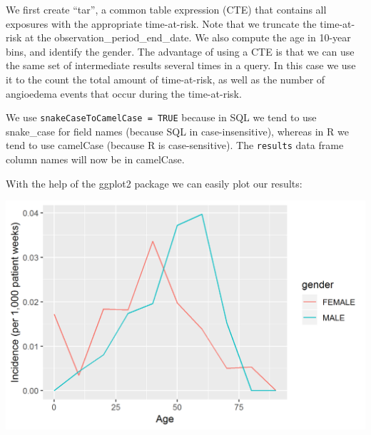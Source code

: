 \documentclass[11pt]{book}
\newenvironment{Shaded}{\begin{snugshade}}{\end{snugshade}}
\newcommand{\KeywordTok}[1]{\textcolor[rgb]{0.13,0.29,0.53}{\textbf{#1}}}
\newcommand{\DataTypeTok}[1]{\textcolor[rgb]{0.13,0.29,0.53}{#1}}
\newcommand{\DecValTok}[1]{\textcolor[rgb]{0.00,0.00,0.81}{#1}}
\newcommand{\StringTok}[1]{\textcolor[rgb]{0.31,0.60,0.02}{#1}}
\newcommand{\CommentTok}[1]{\textcolor[rgb]{0.56,0.35,0.01}{\textit{#1}}}
\newcommand{\OperatorTok}[1]{\textcolor[rgb]{0.81,0.36,0.00}{\textbf{#1}}}
\newcommand{\NormalTok}[1]{#1}
\begin{document}
We first create ``tar'', a common table expression (CTE) that contains
all exposures with the appropriate time-at-risk. Note that we truncate
the time-at-risk at the observation\_period\_end\_date. We also compute
the age in 10-year bins, and identify the gender. The advantage of using
a CTE is that we can use the same set of intermediate results several
times in a query. In this case we use it to the count the total amount
of time-at-risk, as well as the number of angioedema events that occur
during the time-at-risk.

We use \texttt{snakeCaseToCamelCase\ =\ TRUE} because in SQL we tend to
use snake\_case for field names (because SQL in case-insensitive),
whereas in R we tend to use camelCase (because R is case-sensitive). The
\texttt{results} data frame column names will now be in camelCase.

With the help of the ggplot2 package we can easily plot our results:

\begin{Shaded}
\end{Shaded}

\begin{center}\includegraphics[width=0.8\linewidth]{images/SqlAndR/ir} \end{center}
\end{document}
